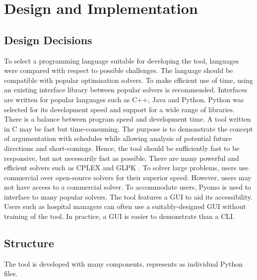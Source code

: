 \chapter{Design and Implementation}

\section{Design Decisions}

To select a programming language suitable for developing the tool, languages were compared with respect to possible challenges. The language should be compatible with popular optimisation solvers. To make efficient use of time, using an existing interface library between popular solvers is recommended. Interfaces are written for popular languages such as C++, Java and Python. Python was selected for its development speed and support for a wide range of libraries.
\linespace
There is a balance between program speed and development time. A tool written in C may be fast but time-consuming. The purpose is to demonstrate the concept of argumentation with schedules while allowing analysis of potential future directions and short-comings. Hence, the tool should be sufficiently fast to be responsive, but not necessarily fast as possible.
\linespace
There are many powerful and efficient solvers such as CPLEX and GLPK \cite{clp}. To solver large problems, users use commercial over open-source solvers for their superior speed. However, users may not have access to a commercial solver. To accommodate users, Pyomo is used to interface to many popular solvers.
\linespace
The tool features a GUI to aid its accessibility. Users such as hospital managers can often use a suitably-designed GUI without training of the tool. In practice, a GUI is easier to demonstrate than a CLI.

\section{Structure}
 
The tool is developed with many components, represents as individual Python files. 

